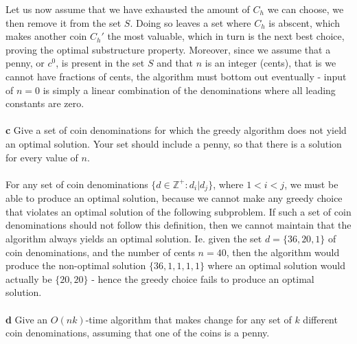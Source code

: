 \documentclass[11pt,english]{article}
\begin{document}
Let us now assume that we have exhausted the amount of $C_h$ we can choose,
we then remove it from the set $S$. Doing so leaves a set where $C_h$ is
abscent, which makes another coin $C_h'$ the most valuable, which in turn is
the next best choice, proving the optimal substructure property. Moreover,
since we assume that a penny, or $c^0$, is present in the set $S$ and that
$n$ is an integer (cents), that is we cannot have fractions of cents, the
algorithm must bottom out eventually - input of $n = 0$ is simply a linear
combination of the denominations where all leading constants are zero.
\\\\
\noindent \large{\textbf{c} Give a set of coin denominations for which the greedy algorithm
does not yield an optimal solution. Your set should include a penny, so
that there is a solution for every value of $n$.}
\\\\
For any set of coin denominations
$\{d \in \mathbb{Z}^{+} : d_i | d_{j}\}$, where $1 < i < j$, we must be able to
produce an optimal solution, because we cannot make any greedy choice that
violates an optimal solution of the following subproblem. If such a set of
coin denominations should not follow this definition, then we cannot maintain
that the algorithm always yields an optimal solution. Ie. given the set
$d = \{36, 20, 1\}$ of coin denominations, and the number of cents $n = 40$,
then the algorithm would produce the non-optimal solution $\{36, 1, 1, 1, 1\}$
where an optimal solution would actually be $\{20, 20\}$ - hence the greedy
choice fails to produce an optimal solution.
\\\\
\noindent \large{\textbf{d} Give an $O(nk)$-time algorithm that makes change for any set of $k$
different coin denominations, assuming that one of the coins is a penny.}
\\\\
%
\end{document}
